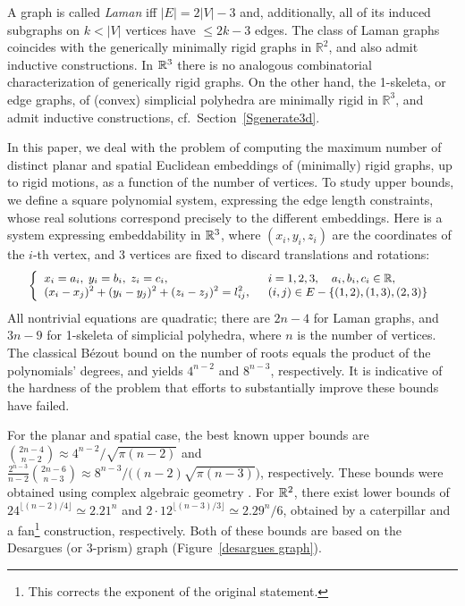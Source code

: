 \documentclass[envcountsame]{llncs}
\begin{document}
A graph is called {\em Laman} iff $|E|=2|V|-3$ and, additionally, 
all of its induced subgraphs on $k<|V|$ vertices have $\le 2k-3$ edges.
The class of Laman graphs coincides with  the generically minimally rigid graphs in $\mathbb{R}^2$,
and also admit inductive constructions.
In ${\mathbb R}^3$ there is no analogous combinatorial characterization
of generically rigid graphs. On the other hand, the 1-skeleta, or edge graphs,
of (convex) simplicial polyhedra are minimally rigid in $\mathbb{R}^3$,
and admit inductive constructions, cf.\ Section\ \ref{Sgenerate3d}.

In this paper, we deal with the problem of computing the maximum number
of distinct planar and spatial Euclidean embeddings of (minimally) rigid graphs,
up to rigid motions, as a function of the number of vertices.
To study upper bounds, we define a square polynomial system, 
expressing the edge length constraints, whose real solutions correspond
precisely to the different embeddings. 
Here is a system expressing embeddability in ${\mathbb R}^3$, where $(x_i,y_i,z_i)$ are the coordinates
of the $i$-th vertex, and 3 vertices are fixed to discard translations and rotations:
\begin{equation}\label{Esystem} \small \left\{ \begin{array}{ll}
      x_i=a_i, \; y_i=b_i, \; z_i=c_i,&  i=1,2,3 , \quad a_i,b_i,c_i\in{\mathbb R}, \\
      (x_i-x_j)^2+(y_i-y_j)^2+(z_i-z_j)^2 = l_{ij}^2,\;\; & (i,j)\in E-\{(1,2),(1,3),(2,3)\}
    \end{array} \right.
\end{equation}
All nontrivial equations are quadratic; there are $2n-4$ for Laman graphs, and $3n-9$
for 1-skeleta of simplicial polyhedra, where $n$ is the number of vertices.
The classical B\'ezout bound on the number of roots equals the product of the
polynomials' degrees, and yields $4^{n-2}$ and $8^{n-3}$, respectively.
It is indicative of the hardness of the problem that efforts to substantially
improve these bounds have failed.

For the planar and spatial case, the best known upper bounds are 
$\binom{2n-4}{n-2} \approx 4^{n-2}/ \sqrt{\pi (n-2)}$ and
$\frac{2^{n-3}}{n-2}\binom{2n-6}{n-3} \approx 8^{n-3}/\big((n-2)\sqrt{\pi (n-3)}\big)$, respectively.
These bounds were obtained using 
complex algebraic geometry \cite{B02,BS04}.
For ${\mathbb R}^2$, there exist   lower bounds of  
$24^{\lfloor (n-2)/4 \rfloor}\simeq 2.21^n$ and $2\cdot 12^{\lfloor (n-3)/3 \rfloor}\simeq 2.29^n/6$, obtained  by  a caterpillar and a 
fan\footnote{This corrects the exponent of the original statement.} construction, respectively. 
Both of these bounds  are based on the  Desargues (or 3-prism) graph
(Figure~\ref{desargues graph}).
\end{document}
